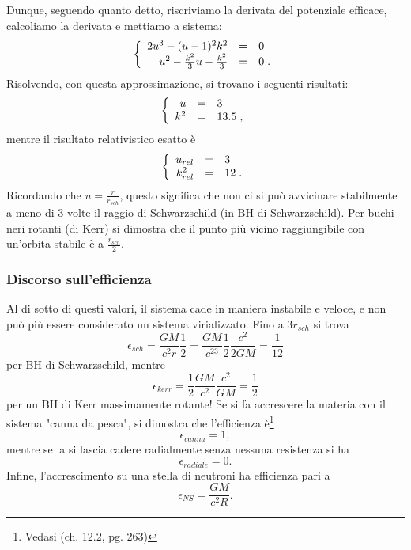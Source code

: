 Dunque, seguendo quanto detto, riscriviamo la derivata del potenziale efficace, calcoliamo la derivata e mettiamo a sistema:
\begin{align}
\left\{
\begin{array}{rcl}
2u^3-(u-1)^2k^2 & = & 0 \\
u^2 - \frac{k^2}{3}u - \frac{k^2}{3} & = & 0\hspace{1mm}.
\end{array}
\right.
\end{align}
Risolvendo, con questa approssimazione, si trovano i seguenti risultati:
\begin{align}
    \left\{
    \begin{array}{rcl}
        u & = & 3 \\
        k^2 & = & 13.5\hspace{1mm},
    \end{array}
    \right.
\end{align}
mentre il risultato relativistico esatto è
\begin{align}
    \left\{
    \begin{array}{rcl}
        u_{rel} & = & 3 \\
        k^2_{rel} & = & 12\hspace{1mm}.
    \end{array}
    \right.
\end{align}
Ricordando che $u = \frac{r}{r_{sch}}$, questo significa che non ci si può avvicinare stabilmente a meno di $3$ volte il raggio di Schwarzschild (in BH di Schwarzschild).
Per buchi neri rotanti (di Kerr) si dimostra che il punto più vicino raggiungibile con un'orbita stabile è a $\frac{r_{sch}}{2}$.

\subsubsection{Discorso sull'efficienza}
Al di sotto di questi valori, il sistema cade in maniera instabile e veloce, e non può più essere considerato un sistema virializzato. 
Fino a $3 r_{sch}$ si trova
\begin{equation}
    \epsilon_{sch}=\frac{GM}{c^2r}\frac{1}{2}=\frac{GM}{c^23}\frac{1}{2}\frac{c^2}{2GM}=\frac{1}{12}
\end{equation}
per BH di Schwarzschild, mentre 
\begin{equation}
    \epsilon_{kerr} = \frac{1}{2}\frac{GM}{c^2}\frac{c^2}{GM} = \frac{1}{2}
\end{equation}
per un BH di Kerr massimamente rotante!
Se si fa accrescere la materia con il sistema "canna da pesca", si dimostra che l'efficienza è\footnote{Vedasi \cite{Rindler_Relativity}(ch. 12.2, pg. 263)}
\begin{equation}
    \epsilon_{canna}=1,
\end{equation}
mentre se la si lascia cadere radialmente senza nessuna resistenza si ha
\begin{equation}
    \epsilon_{radiale} = 0.
\end{equation}
Infine, l'accrescimento su una stella di neutroni ha efficienza pari a
\begin{equation}
    \epsilon_{NS} = \frac{GM}{c^2R}.
\end{equation}


